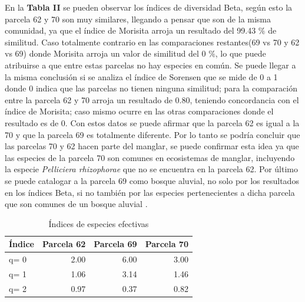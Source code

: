 \documentclass[conference,final,12pt,]{IEEEtran}
\begin{document}
En la \textbf{Tabla II} se pueden observar los índices de diversidad
Beta, según esto la parcela 62 y 70 son muy similares, llegando a pensar
que son de la misma comunidad, ya que el índice de Morisita arroja un
resultado del 99.43 \(\%\) de similitud. Caso totalmente contrario en
las comparaciones restantes(69 vs 70 y 62 vs 69) donde Morisita arroja
un valor de similitud del 0 \(\%\), lo que puede atribuirse a que entre
estas parcelas no hay especies en común. Se puede llegar a la misma
conclusión si se analiza el índice de Sorensen que se mide de 0 a 1
donde 0 indica que las parcelas no tienen ninguna similitud; para la
comparación entre la parcela 62 y 70 arroja un resultado de 0.80,
teniendo concordancia con el índice de Morisita; caso mismo ocurre en
las otras comparaciones donde el resultado es de 0. Con estos datos se
puede afirmar que la parcela 62 es igual a la 70 y que la parcela 69 es
totalmente diferente. Por lo tanto se podría concluir que las parcelas
70 y 62 hacen parte del manglar, se puede confirmar esta idea ya que las
especies de la parcela 70 son comunes en ecosistemas de manglar,
incluyendo la especie \emph{Pelliciera rhizophorae} \citep{Y} que no se
encuentra en la parcela 62. Por último se puede catalogar a la parcela
69 como bosque aluvial, no solo por los resultados en los índices Beta,
si no también por las especies pertenecientes a dicha parcela que son
comunes de un bosque aluvial \citep{Y}.

\begin{table}[htb]

\caption{\label{tab:unnamed-chunk-4}Índices de especies efectivas}
\centering
\begin{tabular}[t]{l|r|r|r}
\hline
Índice & Parcela 62 & Parcela 69 & Parcela 70\\
\hline
q= 0 & 2.00 & 6.00 & 3.00\\
\hline
q= 1 & 1.06 & 3.14 & 1.46\\
\hline
q= 2 & 0.97 & 0.37 & 0.82\\
\hline
\end{tabular}
\end{table}
\end{document}
